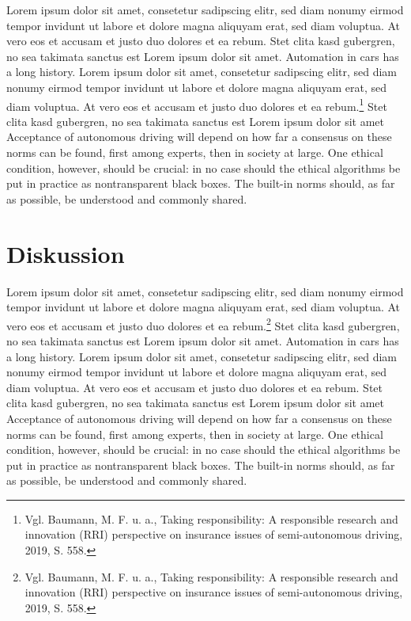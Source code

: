 Lorem ipsum dolor sit amet, consetetur sadipscing elitr, sed diam nonumy eirmod tempor invidunt ut labore et dolore magna aliquyam erat, sed diam voluptua.
At vero eos et accusam et justo duo dolores et ea rebum.
Stet clita kasd gubergren, no sea takimata sanctus est Lorem ipsum dolor sit amet.
Automation in cars has a long history.  Lorem ipsum dolor sit amet, consetetur sadipscing elitr, sed diam nonumy eirmod tempor invidunt ut labore et dolore magna aliquyam erat, sed diam voluptua.
At vero eos et accusam et justo duo dolores et ea rebum.\footnote{Vgl. Baumann, M. F. u. a., Taking responsibility: A responsible research and innovation (RRI) perspective on insurance issues of semi-autonomous driving, 2019, S. 558.}
Stet clita kasd gubergren, no sea takimata sanctus est Lorem ipsum dolor sit amet Acceptance of autonomous driving will depend on how far a consensus on these norms can be found, first among experts, then in society at large.
One ethical condition, however, should be crucial: in no case should the ethical algorithms be put in practice as nontransparent black boxes.
The built-in norms should, as far as possible, be understood and commonly shared.

\section{Diskussion}

Lorem ipsum dolor sit amet, consetetur sadipscing elitr, sed diam nonumy eirmod tempor invidunt ut labore et dolore magna aliquyam erat, sed diam voluptua.
At vero eos et accusam et justo duo dolores et ea rebum.\footnote{Vgl. Baumann, M. F. u. a., Taking responsibility: A responsible research and innovation (RRI) perspective on insurance issues of semi-autonomous driving, 2019, S. 558.}
Stet clita kasd gubergren, no sea takimata sanctus est Lorem ipsum dolor sit amet.
Automation in cars has a long history.  Lorem ipsum dolor sit amet, consetetur sadipscing elitr, sed diam nonumy eirmod tempor invidunt ut labore et dolore magna aliquyam erat, sed diam voluptua.
At vero eos et accusam et justo duo dolores et ea rebum.
Stet clita kasd gubergren, no sea takimata sanctus est Lorem ipsum dolor sit amet Acceptance of autonomous driving will depend on how far a consensus on these norms can be found, first among experts, then in society at large.
One ethical condition, however, should be crucial: in no case should the ethical algorithms be put in practice as nontransparent black boxes.
The built-in norms should, as far as possible, be understood and commonly shared.

